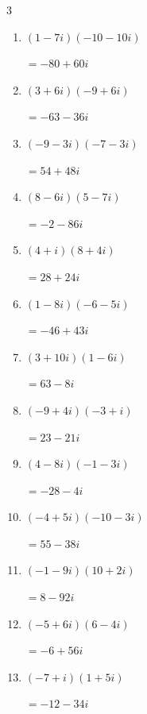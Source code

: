\begin{multicols}{3}
\begin{enumerate}
  \item $\displaystyle (1-7i)(-10-10i)$

        $\displaystyle =-80+60i$

  \item $\displaystyle (3+6i)(-9+6i)$

        $\displaystyle =-63-36i$

  \item $\displaystyle (-9-3i)(-7-3i)$

        $\displaystyle =54+48i$

\columnbreak %

\resetques

  \item $\displaystyle (8-6i)(5-7i)$

        $\displaystyle =-2-86i$

  \item $\displaystyle (4+i)(8+4i)$

        $\displaystyle =28+24i$

  \item $\displaystyle (1-8i)(-6-5i)$

        $\displaystyle =-46+43i$

  \item $\displaystyle (3+10i)(1-6i)$

        $\displaystyle =63-8i$

  \item $\displaystyle (-9+4i)(-3+i)$

        $\displaystyle =23-21i$

  \item $\displaystyle (4-8i)(-1-3i)$

        $\displaystyle =-28-4i$

  \item $\displaystyle (-4+5i)(-10-3i)$

        $\displaystyle =55-38i$

  \item $\displaystyle (-1-9i)(10+2i)$

        $\displaystyle =8-92i$

  \item $\displaystyle (-5+6i)(6-4i)$

        $\displaystyle =-6+56i$

  \item $\displaystyle (-7+i)(1+5i)$

        $\displaystyle =-12-34i$


\end{enumerate}
\end{multicols}
